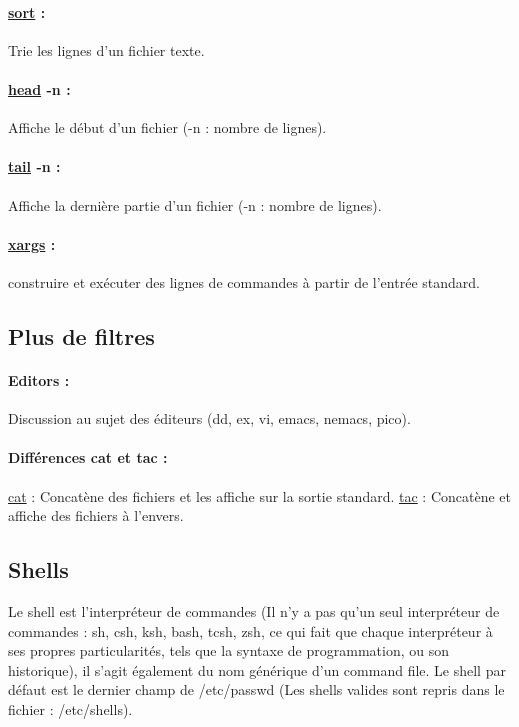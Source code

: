 \documentclass{article}[12pt]
\begin{document}
\paragraph{\href{http://jp.barralis.com/linux-man/man1/sort.1.php}{sort} : } Trie les lignes d'un fichier texte.
\paragraph{\href{http://jp.barralis.com/linux-man/man1/head.1.php}{head} -n : }  Affiche le début d'un fichier (-n : nombre de lignes).  
\paragraph{\href{http://jp.barralis.com/linux-man/man1/tail.1.php}{tail} -n : } Affiche la dernière partie d'un fichier (-n : nombre de lignes).
\paragraph{\href{http://jp.barralis.com/linux-man/man1/xargs.1.php}{xargs} : } construire et exécuter des lignes de commandes à partir de l'entrée standard.
\subsection{ Plus de filtres}
\paragraph{Editors : } Discussion au sujet des éditeurs (dd, ex, vi, emacs, nemacs, pico). 
\paragraph{Différences cat et tac : } \href{http://jp.barralis.com/linux-man/man1/cat.1.php}{cat} : Concatène des fichiers et les affiche sur la sortie standard. \href{http://jp.barralis.com/linux-man/man1/tac.1.php}{tac} : Concatène et affiche des fichiers à l'envers.
\subsection{ Shells}
Le shell est l'interpréteur de commandes (Il n'y a pas qu'un seul interpréteur de commandes : sh, csh, ksh, bash, tcsh, zsh, ce qui fait que chaque interpréteur à ses propres particularités, tels que la syntaxe de programmation, ou son historique), il s'agit également du nom générique d'un command file. Le shell par défaut est le dernier champ de /etc/passwd (Les shells valides sont repris dans le fichier : /etc/shells).
\end{document}
